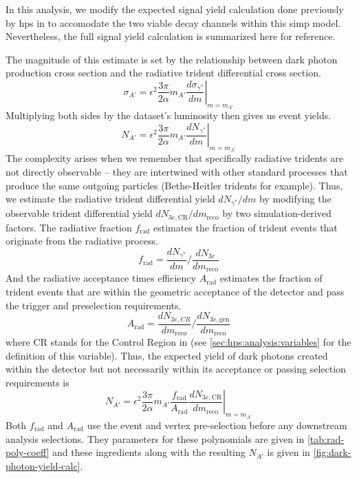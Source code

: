 In this analysis, we modify the expected signal yield calculation done previously by \ac{hps}
in \cite{hps-2016-displaced-vtx} to accomodate the two viable decay channels within this \ac{simp} model.
Nevertheless, the full signal yield calculation is summarized here for reference.

The magnitude of this estimate is set by the relationship between dark photon production cross section
and the radiative trident differential cross section\cite{bjorken-ap-rate:2009}.
\begin{equation}
  \sigma_{A'} = \epsilon^2\frac{3\pi}{2\alpha} m_{A'} \left.\frac{d\sigma_{\gamma^*}}{dm}\right|_{m=m_{A'}}
\end{equation}
Multiplying both sides by the dataset's luminosity then gives us event yields.
\begin{equation}
  N_{A'} = \epsilon^2\frac{3\pi}{2\alpha} m_{A'} \left.\frac{dN_{\gamma^*}}{dm}\right|_{m=m_{A'}}
\end{equation}
The complexity arises when we remember that specifically radiative tridents are not
directly observable -- they are intertwined with other standard processes that produce
the same outgoing particles (Bethe-Heitler tridents for example).
Thus, we estimate the radiative trident differential yield $dN_{\gamma^*}/dm$ by
modifying the observable trident differential yield $dN_{3e\mathrm{,CR}}/dm_\mathrm{reco}$ by
two simulation-derived factors.
The radiative fraction $f_\mathrm{rad}$ estimates the fraction of trident events
that originate from the radiative process.
\begin{equation}
  f_\mathrm{rad} = \frac{dN_{\gamma^*}}{dm} \bigg/ \frac{dN_{3e}}{dm_\mathrm{reco}}
\end{equation}
And the radiative acceptance times efficiency $A_\mathrm{rad}$ estimates the
fraction of trident events that are within the geometric acceptance of the detector
and pass the trigger and preselection requirements.
\begin{equation}
  A_\mathrm{rad} = \frac{dN_{3e,CR}}{dm_\mathrm{reco}} \bigg/ \frac{dN_{3e,\mathrm{gen}}}{dm_\mathrm{reco}}
\end{equation}
where CR stands for the Control Region in \Psum
(see \cref{sec:hps:analysis:variables} for the definition of this variable).
Thus, the expected yield of dark photons created within the detector
but not necessarily within its acceptance or passing selection requirements is
\begin{equation}
  N_{A'} = \epsilon^2\frac{3\pi}{2\alpha} m_{A'} 
    \frac{f_\mathrm{rad}}{A_\mathrm{rad}}
    \left.\frac{dN_{3e\mathrm{,CR}}}{dm_\mathrm{reco}}\right|_{m=m_{A'}}
\end{equation}
Both $f_\mathrm{rad}$ and $A_\mathrm{rad}$ use the event and vertex pre-selection before
any downstream analysis selections.
They parameters for these polynomials are given in \cref{tab:rad-poly-coeff}
and these ingredients along with the resulting $N_{A'}$ is given in \cref{fig:dark-photon-yield-calc}.

